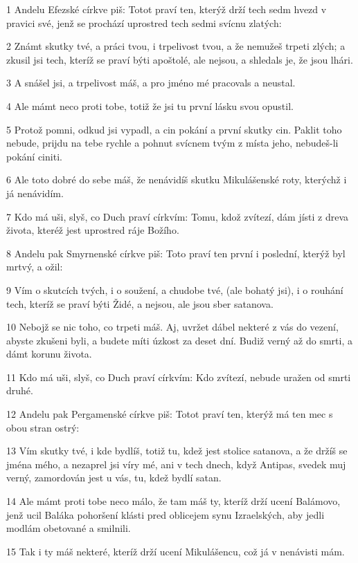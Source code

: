 \par 1 Andelu Efezské církve piš: Totot praví ten, kterýž drží tech sedm hvezd v pravici své, jenž se prochází uprostred tech sedmi svícnu zlatých:
\par 2 Známt skutky tvé, a práci tvou, i trpelivost tvou, a že nemužeš trpeti zlých; a zkusil jsi tech, kteríž se praví býti apoštolé, ale nejsou, a shledals je, že jsou lhári.
\par 3 A snášel jsi, a trpelivost máš, a pro jméno mé pracovals a neustal.
\par 4 Ale mámt neco proti tobe, totiž že jsi tu první lásku svou opustil.
\par 5 Protož pomni, odkud jsi vypadl, a cin pokání a první skutky cin. Paklit toho nebude, prijdu na tebe rychle a pohnut svícnem tvým z místa jeho, nebudeš-li pokání ciniti.
\par 6 Ale toto dobré do sebe máš, že nenávidíš skutku Mikulášenské roty, kterýchž i já nenávidím.
\par 7 Kdo má uši, slyš, co Duch praví církvím: Tomu, kdož zvítezí, dám jísti z dreva života, kteréž jest uprostred ráje Božího.
\par 8 Andelu pak Smyrnenské církve piš: Toto praví ten první i poslední, kterýž byl mrtvý, a ožil:
\par 9 Vím o skutcích tvých, i o soužení, a chudobe tvé, (ale bohatý jsi), i o rouhání tech, kteríž se praví býti Židé, a nejsou, ale jsou sber satanova.
\par 10 Nebojž se nic toho, co trpeti máš. Aj, uvržet dábel nekteré z vás do vezení, abyste zkušeni byli, a budete míti úzkost za deset dní. Budiž verný až do smrti, a dámt korunu života.
\par 11 Kdo má uši, slyš, co Duch praví církvím: Kdo zvítezí, nebude uražen od smrti druhé.
\par 12 Andelu pak Pergamenské církve piš: Totot praví ten, kterýž má ten mec s obou stran ostrý:
\par 13 Vím skutky tvé, i kde bydlíš, totiž tu, kdež jest stolice satanova, a že držíš se jména mého, a nezaprel jsi víry mé, ani v tech dnech, když Antipas, svedek muj verný, zamordován jest u vás, tu, kdež bydlí satan.
\par 14 Ale mámt proti tobe neco málo, že tam máš ty, kteríž drží ucení Balámovo, jenž ucil Baláka pohoršení klásti pred oblicejem synu Izraelských, aby jedli modlám obetované a smilnili.
\par 15 Tak i ty máš nekteré, kteríž drží ucení Mikulášencu, což já v nenávisti mám.
